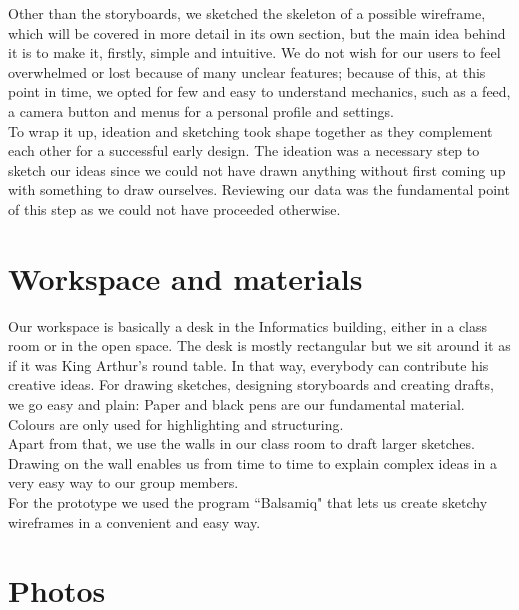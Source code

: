 \documentclass[12pt]{scrartcl}
\begin{document}
	Other than the storyboards, we sketched the skeleton of a possible wireframe, which will be
	covered in more detail in its own section, but the main idea behind it is to make it, firstly,
	simple and intuitive. We do not wish for our users to feel overwhelmed or lost because of
	many unclear features; because of this, at this point in time, we opted for few and easy to
	understand mechanics, such as a feed, a camera button and menus for a personal profile and
	settings.\\
	
	To wrap it up, ideation and sketching took shape together as they complement each other for
	a successful early design. The ideation was a necessary step to sketch our ideas since we
	could not have drawn anything without first coming up with something to draw ourselves.
	Reviewing our data was the fundamental point of this step as we could not have proceeded
	otherwise.

\section{Workspace and materials}

	
	Our workspace is basically a desk in the Informatics building, either in a class room or in the open space. The desk is mostly rectangular 
	but we sit around it as if it was King Arthur's round table. In that way, everybody can contribute his creative ideas. For drawing sketches, 
	designing storyboards and creating drafts, we go easy and plain: Paper and black pens are our fundamental material. 
	Colours are only used for highlighting and structuring.\\
	
	Apart from that, we use the walls in our class room to draft larger sketches. Drawing on the wall enables us from time to time to explain 
	complex ideas in a very easy way to our group members.\\
	
	For the prototype we used the program ``Balsamiq" that lets us create sketchy wireframes in a convenient and easy way.
	
\section{Photos}

	
\end{document}
